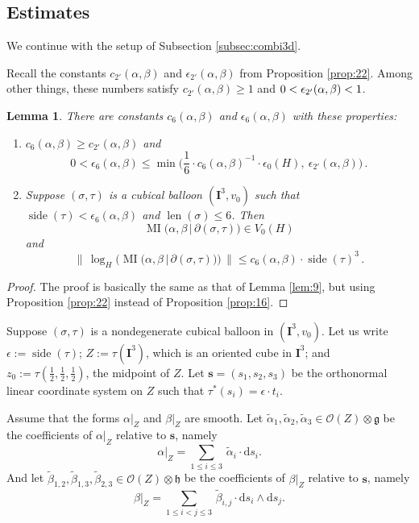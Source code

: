 \documentclass[10pt, a4paper]{amsart}
\newtheorem{lem}[equation]{Lemma}
\theoremstyle{definition}
\numberwithin{equation}{section}
\newcommand{\opn}{\operatorname}
\newcommand{\rmitem}[1]{\item[\text{\textup{(#1)}}]}
\newcommand{\mfrak}[1]{\mathfrak{#1}}
\newcommand{\mcal}[1]{\mathcal{#1}}
\newcommand{\mbf}[1]{\mathbf{#1}}
\newcommand{\mrm}[1]{\mathrm{#1}}
\newcommand{\smfrac}[2]{{\textstyle \frac{#1}{#2}}}
\newcommand{\bsym}[1]{\boldsymbol{#1}}
\newcommand{\til}[1]{\tilde{#1}}
\newcommand{\Norm}[1]{\bigl\lVert\, #1 \, \bigr\rVert}
\renewcommand{\vert}{\, | \,}
\newcommand{\g}{\mfrak{g}}
\newcommand{\h}{\mfrak{h}}
\renewcommand{\d}{\mrm{d}}
\newcommand{\lb}{\linebreak}
\begin{document}
\subsection{Estimates} \label{subsec:est}
We continue with the setup of Subsection \ref{subsec:combi3d}.

Recall the constants $c_{2'}(\alpha, \beta)$ and $\epsilon_{2'}(\alpha, \beta)$
from Proposition \ref{prop:22}. \lb Among other things, these numbers satisfy
$c_{2'}(\alpha, \beta) \geq 1$ and $0 < \epsilon_{2'}(\alpha, \beta) \lb < 1$.

\begin{lem} \label{lem:26}
There are constants $c_6(\alpha, \beta)$ and
$\epsilon_6(\alpha, \beta)$ with these properties:
\begin{enumerate}
\rmitem{i} $c_6(\alpha, \beta) \geq c_{2'}(\alpha, \beta)$ and
\[ 0 < \epsilon_6(\alpha, \beta) \leq \min \bigl(
\smfrac{1}{6} \cdot c_6(\alpha, \beta)^{-1} \cdot \epsilon_0(H) , \
\epsilon_{2'}(\alpha, \beta) \bigr) \, . \]
\rmitem{ii} Suppose $(\sigma, \tau)$ is a cubical balloon
$(\mbf{I}^3, v_0)$
such that 
$\opn{side}(\tau) < \epsilon_6(\alpha, \beta)$ 
and $\opn{len}(\sigma) \leq 6$. Then
\[ \opn{MI} \bigl( \alpha, \beta \vert 
\partial (\sigma, \tau) \bigr) \in V_0(H) \]
and
\[ \Norm{ \log_H \bigl( \opn{MI} \bigl( \alpha, \beta \vert 
\partial (\sigma, \tau) \bigr) \bigr) }
\leq c_6(\alpha, \beta) \cdot \opn{side}(\tau)^3  \, . \]
\end{enumerate}
\end{lem}

\begin{proof}
The proof is basically the same as that of Lemma \ref{lem:9}, but using
Proposition \ref{prop:22} instead of Proposition \ref{prop:16}.
\end{proof}

Suppose $(\sigma, \tau)$ is a nondegenerate cubical balloon in
$(\mbf{I}^3, v_0)$. Let us write $\epsilon := \opn{side}(\tau)$; 
$Z := \tau(\mbf{I}^3)$, which is an oriented cube in $\mbf{I}^3$; and 
$z_0 := \tau(\smfrac{1}{2}, \smfrac{1}{2}, \smfrac{1}{2})$, the midpoint of $Z$.
Let $\bsym{s} = (s_1, s_2, s_3)$ be the orthonormal linear coordinate system on
$Z$ such that 
$\tau^*(s_i) = \epsilon \cdot t_i$.

Assume that the forms $\alpha|_Z$ and $\beta|_Z$ are smooth. Let 
$\til{\alpha}_1, \til{\alpha}_2, \til{\alpha}_3 \in 
\mcal{O}(Z) \otimes \g$
be the coefficients of $\alpha|_Z$ relative to $\bsym{s}$, namely 
\[ \alpha|_Z = \sum_{1 \leq i \leq 3} \, \til{\alpha}_i \cdot \d s_i . \]
And let
$\til{\beta}_{1, 2}, \til{\beta}_{1, 3}, \til{\beta}_{2, 3}  \in 
\mcal{O}(Z) \otimes \h$
be the coefficients of $\beta|_Z$ relative to $\bsym{s}$, namely 
\[ \beta|_Z = \sum_{1 \leq i < j \leq 3} \, 
\til{\beta}_{i, j} \cdot \d s_i \wedge \d s_j . \]
\end{document}

